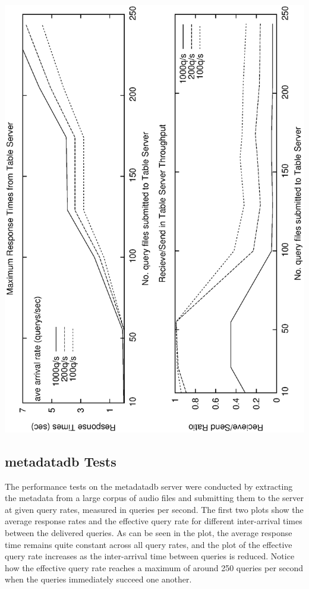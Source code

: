 \documentclass[11pt, a4paper]{article}
\begin{document}
\includegraphics[angle=-90,width=\linewidth]{tblperfthruput.eps}

\subsection{metadatadb Tests}
The performance tests on the metadatadb server were conducted by extracting the metadata 
from a large corpus of audio files and submitting them to the server at given query rates,
measured in queries per second.  The first two plots show the average response rates and the
effective query rate for different inter-arrival times between the delivered queries. As can
be seen in the plot, the average response time remains quite constant across all query rates,
and the plot of the effective query rate increases as the inter-arrival time between queries is
reduced. Notice how the effective query rate reaches a maximum of around 250 queries per second 
when the queries immediately succeed one another.
\end{document}
